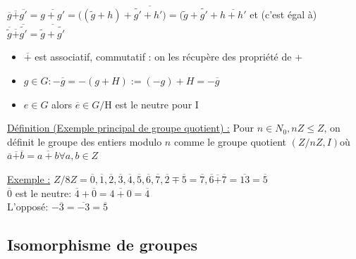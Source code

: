 \documentclass[11pt]{article}
\begin{document}
			$\overline{g} \overline{+} \overline{g'} = \overline{g+g'} = ((\tilde{g}+h) + \overline{\tilde{g'} + h')} = (\tilde{g} + \tilde{g'} + \overline{h + h'}$
			et (c'est égal à) $\overline{\tilde{g}} \overline{+} \overline{\tilde{g'}} = \overline{\tilde{g}+\tilde{g'}}$
			
			\begin{itemize}
			 \item $\overline{+}$ est associatif, commutatif : on les récupère des propriété de +
			 \item $g \in G : -\overline{g} = -(g+H) := (-g) + H = -\overline{g}$
			 \item $e \in G$ alors $\overline{e} \in G/$H est le neutre pour I
			\end{itemize}

			\underline{Définition (Exemple principal de groupe quotient) :} Pour $n \in N_0, n Z \leq Z$, on définit le groupe des entiers modulo $n$ comme le groupe quotient $(Z/nZ, I) $où$ \overline{a} \overline{+} \overline{b} = \overline{a+b} \forall a, b \in Z$
			
			\underline{Exemple :} $Z/8Z = {\overline{0}, \overline{1}, \overline{2}, \overline{3}, \overline{4}, \overline{5}, \overline{6}, \overline{7}}, \overline{2} \mp \overline{5} = \overline{7}, \overline{6} \overline{+} \overline{7} = \overline{13} = \overline{5}$\\
				$\overline{0}$ est le neutre: $\overline{4} + \overline{0} = \overline{4+0} = \overline{4}$\\
				L'opposé: $- \overline 3 = \overline{-3} = \overline{5}$
		
		\subsection{Isomorphisme de groupes}
\end{document}
